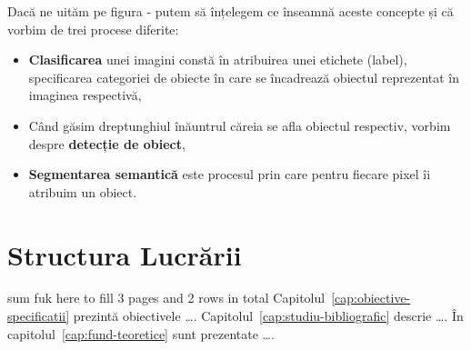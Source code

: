 Dacă ne uităm pe figura - putem să înțelegem ce înseamnă aceste concepte și că vorbim de trei procese diferite:
\begin{itemize}
	\item \textbf{Clasificarea} unei imagini constă în atribuirea unei etichete (label), specificarea categoriei de obiecte în care se încadrează obiectul reprezentat în imaginea respectivă,
	\item Când găsim dreptunghiul înăuntrul căreia se afla obiectul respectiv, vorbim despre \textbf{detecție de obiect},
	\item \textbf{Segmentarea semantică} este procesul prin care pentru fiecare pixel îi atribuim un obiect.
\end{itemize}
\section {Structura Lucrării}
sum fuk here to fill 3 pages and 2 rows in total
Capitolul~\ref{cap:obiective-specificatii} prezintă obiectivele \dots. Capitolul~\ref{cap:studiu-bibliografic} descrie \dots. În capitolul~\ref{cap:fund-teoretice} sunt prezentate \dots.
